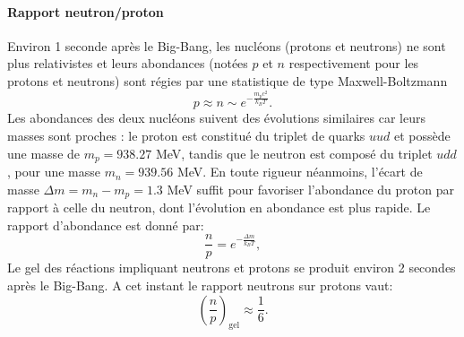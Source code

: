 \paragraph{Rapport neutron/proton}
 Environ 1 seconde après le Big-Bang, les nucléons (protons et neutrons) ne sont plus relativistes et leurs abondances (notées $p$ et $n$ respectivement pour les protons et neutrons) sont régies par une statistique de type Maxwell-Boltzmann
\begin{equation}
p\approx n \sim e^{-\frac{m_p c^2}{k_B T}}.
\end{equation}
Les abondances des deux nucléons suivent des évolutions similaires car leurs masses sont proches : le proton est constitué du triplet de quarks $uud$  et possède une masse de $m_p=938.27$ MeV, tandis que le neutron est composé du triplet $udd$, pour une masse $m_n=939.56$ MeV. En toute rigueur néanmoins, l'écart de masse $\Delta m=m_n-m_p=1.3$ MeV suffit pour favoriser l'abondance du proton par rapport à celle du neutron, dont l'évolution en abondance est plus rapide. Le rapport d'abondance est donné par:
\begin{equation}
\frac{n}{p}=e^{-\frac{\Delta m}{k_B T}},
\end{equation}
Le gel des réactions impliquant neutrons et protons se produit environ 2 secondes après le Big-Bang. A cet instant le rapport neutrons sur protons vaut:
\begin{equation}
\left(\frac{n}{p}\right)_\mathrm{gel}\approx\frac{1}{6}.
\end{equation}


